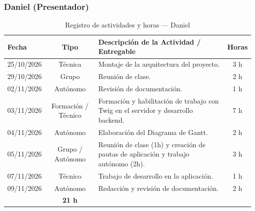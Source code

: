 \subsubsection{Daniel (Presentador)}
\begin{table}[H]
\centering
\small
{}
\begin{tabularx}{\textwidth}{l c X c}
\toprule
\rowcolor{verdeApagado}
\textbf{\color{textoOscuro}Fecha} & \textbf{\color{textoOscuro}Tipo} & \textbf{\color{textoOscuro}Descripción de la Actividad / Entregable} & \textbf{\color{textoOscuro}Horas} \\
\midrule
25/10/2026 & Técnica & Montaje de la arquitectura del proyecto. & 3 h \\
29/10/2026 & Grupo & Reunión de clase. & 2 h \\
02/11/2026 & Autónomo & Revisión de documentación. & 1 h \\
03/11/2026 & Formación / Técnico & Formación y habilitación de trabajo con Twig en el servidor y desarrollo backend. & 7 h \\
04/11/2026 & Autónomo & Elaboración del Diagrama de Gantt. & 2 h \\
05/11/2026 & Grupo / Autónomo & Reunión de clase (1h) y creación de pautas de aplicación y trabajo autónomo (2h). & 3 h \\
07/11/2026 & Técnico & Trabajo de desarrollo en la aplicación. & 1 h \\
09/11/2026 & Autónomo & Redacción y revisión de documentación. & 2 h \\
\midrule
\rowcolor{azulclaro!60}
\multicolumn{3}{l}{\textbf{\color{textoOscuro}Total Horas Dedicadas — Daniel:}} & \textbf{\color{textoOscuro}21 h} \\
\bottomrule
\end{tabularx}
\caption{Registro de actividades y horas — Daniel}
\end{table}

